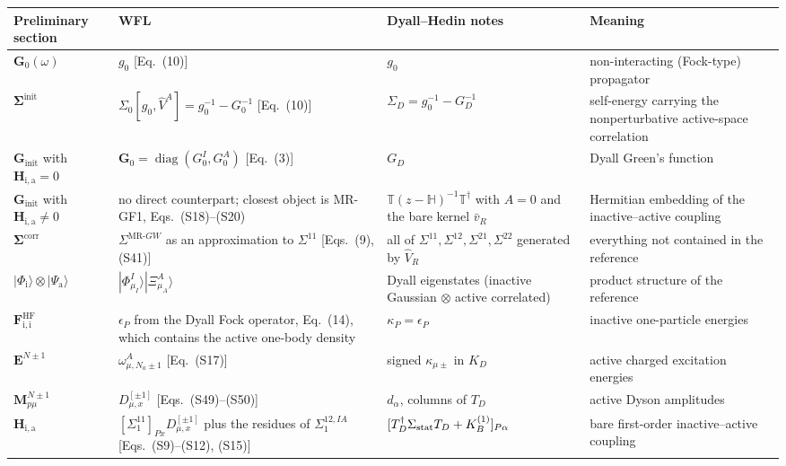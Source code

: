 \documentclass[11pt,a4paper]{article}
\newcommand{\bG}{\boldsymbol{G}}
\newcommand{\bSigma}{\boldsymbol{\Sigma}}
\newcommand{\bH}{\boldsymbol{H}}
\newcommand{\bM}{\boldsymbol{M}}
\newcommand{\bE}{\boldsymbol{E}}
\newcommand{\bF}{\boldsymbol{F}}
\newcommand{\bbH}{\mathbb{H}}
\newcommand{\bbT}{\mathbb{T}}
\newcommand{\ket}[1]{|#1\rangle}
\newcommand{\WFL}{WFL}
\newcommand{\Pre}{Preliminary section}
\newcommand{\DHN}{Dyall--Hedin notes}
\begin{document}
\begin{table}[h!]
\centering
\small
\begin{tabular}{>{\raggedright\arraybackslash}p{3.1cm}>{\raggedright\arraybackslash}p{4.2cm}>{\raggedright\arraybackslash}p{3.8cm}>{\raggedright\arraybackslash}p{3.3cm}}
\toprule
\Pre{} & \WFL{} & \DHN{} & Meaning \\
\midrule
$\bG_0(\omega)$ & $g_0$ [Eq.~(10)] & $g_0$ & non-interacting (Fock-type) propagator \\[1mm]
$\bSigma^{\text{init}}$ & $\Sigma_0[g_0,\hat V^A]=g_0^{-1}-G_0^{-1}$ [Eq.~(10)] & $\Sigma_D=g_0^{-1}-G_D^{-1}$ & self-energy carrying the nonperturbative active-space correlation \\[1mm]
$\bG_{\text{init}}$ with $\bH_{\mathrm{i,a}}=0$ & $\mathbf G_0=\operatorname{diag}(G_0^I,G_0^A)$ [Eq.~(3)] & $G_D$ & Dyall Green's function \\[1mm]
$\bG_{\text{init}}$ with $\bH_{\mathrm{i,a}}\neq0$ & no direct counterpart; closest object is MR-GF1, Eqs.~(S18)--(S20) & $\bbT(z-\bbH)^{-1}\bbT^\dagger$ with $A=0$ and the bare kernel $\bar v_R$ & Hermitian embedding of the inactive--active coupling \\[1mm]
$\bSigma^{\text{corr}}$ & $\Sigma^{\text{MR-}GW}$ as an approximation to $\Sigma^{11}$ [Eqs.~(9), (S41)] & all of $\Sigma^{11},\Sigma^{12},\Sigma^{21},\Sigma^{22}$ generated by $\hat V_R$ & everything not contained in the reference \\[1mm]
$\ket{\Phi_{\mathrm i}}\otimes\ket{\Psi_{\mathrm a}}$ & $\ket{\Phi^I_{\mu_I}}\ket{\Xi^A_{\mu_A}}$ & Dyall eigenstates (inactive Gaussian $\otimes$ active correlated) & product structure of the reference \\[1mm]
$\bF^{\text{HF}}_{\mathrm{i,i}}$ & $\epsilon_P$ from the Dyall Fock operator, Eq.~(14), which contains the active one-body density & $\kappa_P=\epsilon_P$ & inactive one-particle energies \\[1mm]
$\bE^{N\pm1}$ & $\omega^A_{\mu,N_a\pm1}$ [Eq.~(S17)] & signed $\kappa_{\mu\pm}$ in $K_D$ & active charged excitation energies \\[1mm]
$\bM^{N\pm1}_{p\mu}$ & $D^{[\pm1]}_{\mu,x}$ [Eqs.~(S49)--(S50)] & $d_\alpha$, columns of $T_D$ & active Dyson amplitudes \\[1mm]
$\bH_{\mathrm{i,a}}$ & $[\Sigma_1^{11}]_{Px}D^{[\pm1]}_{\mu,x}$ plus the residues of $\Sigma_1^{12,IA}$ [Eqs.~(S9)--(S12), (S15)] & $[T_D^\dagger\Sigma_{\rm stat}T_D+K_B^{(1)}]_{P\alpha}$ & bare first-order inactive--active coupling \\[1mm]

\end{tabular}
\end{table}
\end{document}
